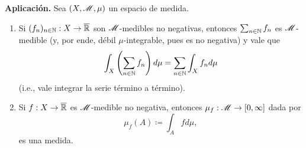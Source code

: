 
\textbf{Aplicación.} Sea $(X, \mathscr{M}, \mu)$ un espacio de medida.
\begin{enumerate}
	\item Si $(f_{n})_{n\in\mathbb{N}} : X \to \overline{\mathbb{R}}$ son $\mathscr{M}$-medibles no negativas, entonces $\sum_{n\in\mathbb{N}}^{} f_{n}$ es $\mathscr{M}$-medible (y, por ende, débil $\mu$-integrable, pues es no negativa) y vale que
	\[ \int_{X} \left( \sum_{n\in\mathbb{N}}^{} f_{n} \right) d\mu = \sum_{n\in\mathbb{N}}^{} \int_{X} f_{n} d\mu \]
	(i.e., vale integrar la serie término a término).

	\item Si $f : X \to \overline{\mathbb{R}}$ es $\mathscr{M}$-medible no negativa, entonces $\mu_{f} : \mathscr{M} \to [0,\infty]$ dada por
	\[ \mu_{f}(A) \coloneq \int_{A} f d\mu, \]
	es una medida.
\end{enumerate}
